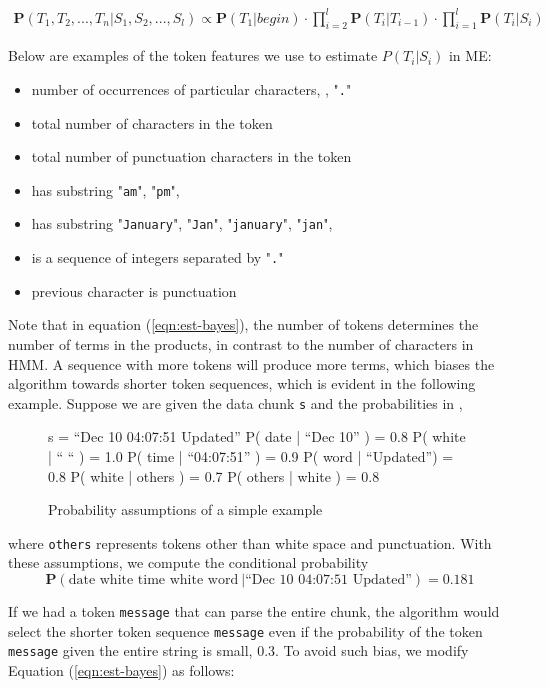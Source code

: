 \begin{eqnarray}\label{eqn:est-bayes}
\mathbf{P}(T_1, T_2, ..., T_n|S_1, S_2, ..., S_l) \propto
\mathbf{P}(T_1|begin) \cdot \prod_{i=2}^{l}\mathbf{P}(T_i|T_{i-1})
\cdot \prod_{i=1}^{l}\mathbf{P}(T_i|S_i)
\end{eqnarray}

Below are examples of the token features we use to estimate
$P(T_i|S_i)$ in ME:

\begin{itemize}
\item number of occurrences of particular characters, \ie{}, "{\tt .}"
\item total number of characters in the token
\item total number of punctuation characters in the token
\item has substring "{\tt am}", "{\tt pm}", \etc{}
\item has substring "{\tt January}", "{\tt Jan}", "{\tt january}",
"{\tt jan}", \etc{}
\item is a sequence of integers separated by "{\tt .}"
\item previous character is punctuation
\end{itemize}

Note that in equation (\ref{eqn:est-bayes}), the number of tokens
determines the number of terms in the products, in contrast to the
number of characters in HMM. A sequence with more tokens will produce
more terms, which biases the algorithm towards shorter token
sequences, which is evident in the following example.  Suppose we are
given the data chunk {\tt s} and the probabilities in ,
\begin{figure}[t]
\begin{centercode}
s  = ``Dec 10 04:07:51 Updated''
P( date | ``Dec 10'' ) = 0.8
P( white | `` `` ) = 1.0
P( time | ``04:07:51'' ) = 0.9
P( word | ``Updated'') = 0.8
P( white | others ) = 0.7
P( others | white ) = 0.8
\end{centercode}
\caption{Probability assumptions of a simple example}\label{fig:ME}
\end{figure}
%
where {\tt others} represents tokens other than white space and
punctuation. With these assumptions, we compute the conditional probability
\[\mathbf{P}(\mbox{date white time white word}~ | \mbox{``Dec 10 04:07:51 Updated''}) = 0.181 \]

If we had a token {\tt message} that can parse the entire chunk,
the algorithm would select the shorter token sequence {\tt message}
even if the probability of the token {\tt message} given the entire
string is small, \eg{} 0.3.  To avoid such bias, we modify
Equation (\ref{eqn:est-bayes}) as follows:

